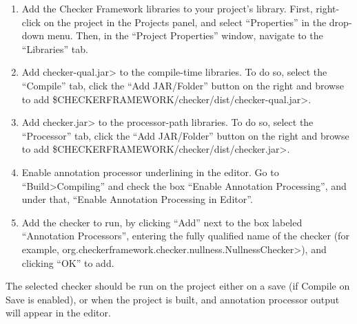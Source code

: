 \begin{enumerate}
\item
  Add the Checker Framework libraries to your project's
  library. First, right-click on the project in the Projects panel,
  and select ``Properties'' in the drop-down menu. Then, in the
  ``Project Properties'' window, navigate to the ``Libraries'' tab.

\item
  Add \<checker-qual.jar> to the compile-time libraries. To do so,
  select the ``Compile'' tab, click the ``Add JAR/Folder'' button on
  the right and browse to
  add \<\$CHECKERFRAMEWORK/checker/dist/checker-qual.jar>.

\item
  Add \<checker.jar> to the processor-path libraries. To do so, select
  the ``Processor'' tab, click the ``Add JAR/Folder'' button on the
  right and browse to
  add \<\$CHECKERFRAMEWORK/checker/dist/checker.jar>.

\item
  Enable annotation processor underlining in the editor. Go to
  ``Build>Compiling'' and check the box ``Enable Annotation
  Processing'', and under that, ``Enable Annotation Processing in
  Editor''.

\item
  Add the checker to run, by clicking ``Add'' next to the box labeled
  ``Annotation Processors'', entering the fully qualified name of the
  checker (for
  example, \<org.checkerframework.checker.nullness.NullnessChecker>),
  and clicking ``OK'' to add.
\end{enumerate}

The selected checker should be run on the project either on a save (if
Compile on Save is enabled), or when the project is built, and
annotation processor output will appear in the editor.



